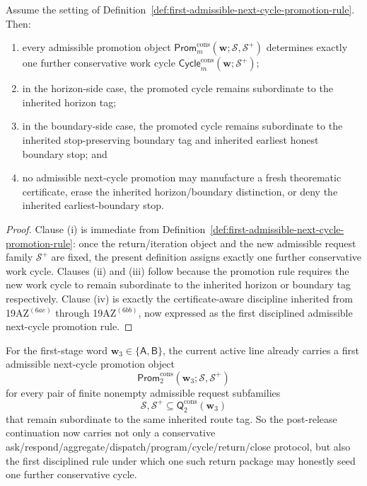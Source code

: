 \begin{proposition}
\label{prop:every-admissible-next-cycle-promotion-object-seeds-exactly-one-further-conservative-work-cycle-under-the-inherited-route-tag}
Assume the setting of Definition~\ref{def:first-admissible-next-cycle-promotion-rule}. Then:
\begin{enumerate}[label=(\roman*)]
 \item every admissible promotion object \(\mathsf{Prom}^{\mathrm{cons}}_{m}(\mathbf w;\mathcal S,\mathcal S^{+})\) determines exactly one further conservative work cycle \(\mathsf{Cycle}^{\mathrm{cons}}_{m}(\mathbf w;\mathcal S^{+})\);
 \item in the horizon-side case, the promoted cycle remains subordinate to the inherited horizon tag;
 \item in the boundary-side case, the promoted cycle remains subordinate to the inherited stop-preserving boundary tag and inherited earliest honest boundary stop; and
 \item no admissible next-cycle promotion may manufacture a fresh theorematic certificate, erase the inherited horizon/boundary distinction, or deny the inherited earliest-boundary stop.
\end{enumerate}
\end{proposition}

\begin{proof}
Clause (i) is immediate from Definition~\ref{def:first-admissible-next-cycle-promotion-rule}: once the return/iteration object and the new admissible request family \(\mathcal S^{+}\) are fixed, the present definition assigns exactly one further conservative work cycle. Clauses (ii) and (iii) follow because the promotion rule requires the new work cycle to remain subordinate to the inherited horizon or boundary tag respectively. Clause (iv) is exactly the certificate-aware discipline inherited from 19AZ$^{(6ae)}$ through 19AZ$^{(6bb)}$, now expressed as the first disciplined admissible next-cycle promotion rule.
\end{proof}

\begin{corollary}
\label{cor:the-present-post-v3290-line-already-carries-a-first-admissible-next-cycle-promotion-rule}
For the first-stage word \(\mathbf w_3\in\{\mathsf A,\mathsf B\}\), the current active line already carries a first admissible next-cycle promotion object
\[
 \mathsf{Prom}^{\mathrm{cons}}_{2}(\mathbf w_3;\mathcal S,\mathcal S^{+})
\]
for every pair of finite nonempty admissible request subfamilies
\[
 \mathcal S,\mathcal S^{+}\subseteq \mathsf{Q}^{\mathrm{cons}}_{2}(\mathbf w_3)
\]
that remain subordinate to the same inherited route tag. So the post-release continuation now carries not only a conservative ask/respond/aggregate/dispatch/program/cycle/return/close protocol, but also the first disciplined rule under which one such return package may honestly seed one further conservative cycle.
\end{corollary}

